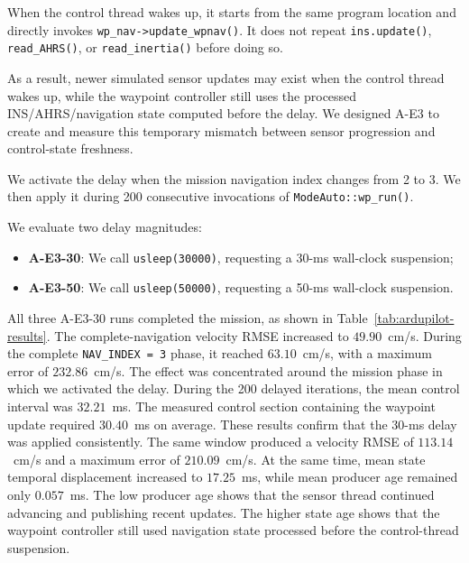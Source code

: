 \noindent When the control thread wakes up, it starts from the same program location and directly invokes \texttt{wp\_nav->update\_wpnav()}. It does not repeat \texttt{ins.update()}, \texttt{read\_AHRS()}, or \texttt{read\_inertia()} before doing so.

\noindent As a result, newer simulated sensor updates may exist when the control thread wakes up, while the waypoint controller still uses the processed INS/AHRS/navigation state computed before the delay. We designed A-E3 to create and measure this temporary mismatch between sensor progression and control-state freshness.

\noindent We activate the delay when the mission navigation index changes from 2 to 3. We then apply it during 200 consecutive invocations of \texttt{ModeAuto::wp\_run()}.

\noindent We evaluate two delay magnitudes:
\begin{itemize}[nosep]
    \item \textbf{A-E3-30}: We call \texttt{usleep(30000)}, requesting a 30-ms wall-clock suspension;
    \item \textbf{A-E3-50}: We call \texttt{usleep(50000)}, requesting a 50-ms wall-clock suspension.
\end{itemize}

\noindent All three A-E3-30 runs completed the mission, as shown in
Table~\ref{tab:ardupilot-results}. The complete-navigation velocity
RMSE increased to \(49.90\)~cm/s. During the complete
\texttt{NAV\_INDEX = 3} phase, it reached \(63.10\)~cm/s, with a
maximum error of \(232.86\)~cm/s. The effect was concentrated around the mission phase in which we activated the delay.
During the 200 delayed iterations, the mean control interval was
\(32.21\)~ms. The measured control section containing the waypoint
update required \(30.40\)~ms on average. These results confirm that the 30-ms delay was applied consistently.
The same window produced a velocity RMSE of \(113.14\)~cm/s and a
maximum error of \(210.09\)~cm/s. At the same time, mean state
temporal displacement increased to \(17.25\)~ms, while mean producer age remained only \(0.057\)~ms.
The low producer age shows that the sensor thread continued advancing and publishing recent updates. The higher state age shows that the waypoint controller still used navigation state processed before the control-thread suspension.

